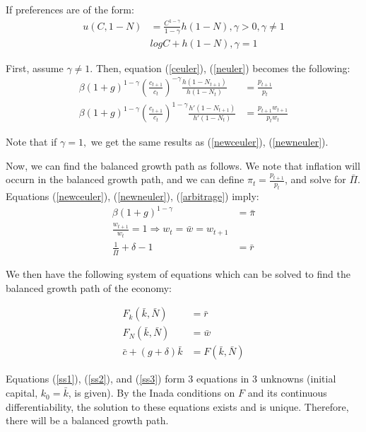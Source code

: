 \documentclass[11pt]{article} %
\begin{document}
If preferences are of the form:
\begin{align*}
u(C,1-N) &= \frac{C^{1-\gamma}}{1-\gamma}h (1-N), \gamma >0, \gamma \neq 1\\
& logC + h(1-N), \gamma = 1
\end{align*}

First, assume $\gamma \neq 1.$ Then, equation (\ref{ceuler}), (\ref{neuler}) becomes the following:
\begin{align}
\beta (1+g)^{1-\gamma}\left( \frac{c_{t+1}}{c_t}\right)^{-\gamma} \frac{h(1-N_{t+1})}{h(1-N_t)} &= \frac{p_{t+1}}{p_t} \label{newceuler} \\
\beta (1+g)^{1-\gamma}\left( \frac{c_{t+1}}{c_t}\right)^{1-\gamma} \frac{h'(1-N_{t+1})}{h'(1-N_t)} &= \frac{p_{t+1}w_{t+1}}{p_tw_t} \label{newneuler}
\end{align}

Note that if $\gamma=1,$ we get the same results as (\ref{newceuler}), (\ref{newneuler}).

Now, we can find the balanced growth path as follows. We note that inflation will occurn in the balanced growth path, and we can define $\pi_t = \frac{p_{t+1}}{p_t}$, and solve for $\bar{\Pi}$. Equations (\ref{newceuler}), (\ref{newneuler}), (\ref{arbitrage}) imply:
\begin{align*}
\beta(1+g)^{1-\gamma} &= \bar{\pi}\\
\frac{w_{t+1}}{w_t} = 1 \Rightarrow w_t = \bar{w} = w_{t+1} \\
\frac{1}{\bar{\Pi}} + \delta - 1 &= \bar{r}
\end{align*}

We then have the following system of equations which can be solved to find the balanced growth path of the economy:

\begin{align}
F_k(\bar{k},\bar{N}) &= \bar{r} \label{ss1}\\
F_N(\bar{k},\bar{N}) &= \bar{w}\label{ss2} \\
\bar{c} + (g+\delta)\bar{k} &= F(\bar{k},\bar{N}) \label{ss3}
\end{align}

Equations (\ref{ss1}), (\ref{ss2}), and (\ref{ss3}) form 3 equations in 3 unknowns (initial capital, $k_0 = \bar{k}$, is given). By the Inada conditions on $F$ and its continuous differentiability, the solution to these equations exists and is unique. Therefore, there will be a balanced growth path.
\end{document}
